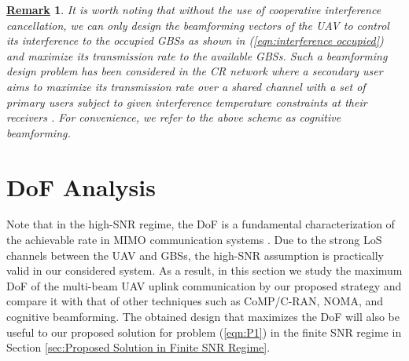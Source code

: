 \documentclass[onecolumn, draftclsnofoot, 12pt]{IEEEtran}
\newtheorem{remark}{\underline{Remark}}
\begin{document}
\begin{remark}\label{remark1}
It is worth noting that without the use of cooperative interference cancellation, we can only design the beamforming vectors of the UAV to control its interference to the occupied GBSs as shown in (\ref{eqn:interference occupied}) and maximize its transmission rate to the available GBSs. Such a beamforming design problem has been considered in the CR network where a secondary user aims to maximize its transmission rate over a shared channel with a set of primary users subject to given interference temperature constraints at their receivers \cite{Interference_Temperature}. For convenience, we refer to the above scheme as cognitive beamforming.

\end{remark}



\section{DoF Analysis}\label{sec:Proposed Solution}

Note that in the high-SNR regime, the DoF is a fundamental characterization of the achievable rate in MIMO communication systems \cite{Tse}. Due to the strong LoS channels between the UAV and GBSs, the high-SNR assumption is practically valid in our considered system. As a result, in this section we study the maximum DoF of the multi-beam UAV  uplink communication by our proposed strategy and compare it with that of other techniques such as CoMP/C-RAN, NOMA, and cognitive beamforming. The obtained design that maximizes the DoF will also be useful to our proposed solution for problem (\ref{eqn:P1}) in the finite SNR regime in Section \ref{sec:Proposed Solution in Finite SNR Regime}.
\end{document}
